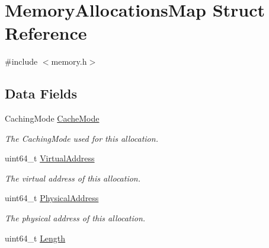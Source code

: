 \hypertarget{structMemoryAllocationsMap}{}\section{Memory\+Allocations\+Map Struct Reference}
\label{structMemoryAllocationsMap}


{\ttfamily \#include $<$memory.\+h$>$}

\subsection*{Data Fields}
\begin{DoxyCompactItemize}
\item 
Caching\+Mode \hyperlink{structMemoryAllocationsMap_a08c56993ab4612a97722b137c4e28ca1}{Cache\+Mode}\hypertarget{structMemoryAllocationsMap_a08c56993ab4612a97722b137c4e28ca1}{}\label{structMemoryAllocationsMap_a08c56993ab4612a97722b137c4e28ca1}

\begin{DoxyCompactList}\small\item\em The Caching\+Mode used for this allocation. \end{DoxyCompactList}\item 
uint64\+\_\+t \hyperlink{structMemoryAllocationsMap_a90507e8d6366b8f3bf34b9a96e0e8346}{Virtual\+Address}\hypertarget{structMemoryAllocationsMap_a90507e8d6366b8f3bf34b9a96e0e8346}{}\label{structMemoryAllocationsMap_a90507e8d6366b8f3bf34b9a96e0e8346}

\begin{DoxyCompactList}\small\item\em The virtual address of this allocation. \end{DoxyCompactList}\item 
uint64\+\_\+t \hyperlink{structMemoryAllocationsMap_a27cbacbed8d041f372dd35378a831657}{Physical\+Address}\hypertarget{structMemoryAllocationsMap_a27cbacbed8d041f372dd35378a831657}{}\label{structMemoryAllocationsMap_a27cbacbed8d041f372dd35378a831657}

\begin{DoxyCompactList}\small\item\em The physical address of this allocation. \end{DoxyCompactList}\item 
uint64\+\_\+t \hyperlink{structMemoryAllocationsMap_a4843d10e317bb2ed7f7531cce438e1d8}{Length}\hypertarget{structMemoryAllocationsMap_a4843d10e317bb2ed7f7531cce438e1d8}{}\label{structMemoryAllocationsMap_a4843d10e317bb2ed7f7531cce438e1d8}


\end{DoxyCompactItemize}
